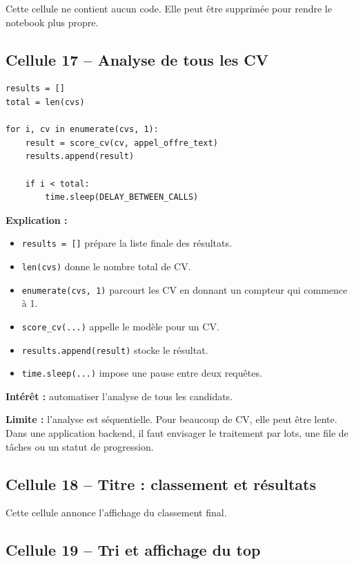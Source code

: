 \documentclass[12pt,a4paper]{article}
\begin{document}
Cette cellule ne contient aucun code. Elle peut être supprimée pour rendre le notebook plus propre.

\subsection{Cellule 17 -- Analyse de tous les CV}

\begin{lstlisting}[style=pythonstyle]
results = []
total = len(cvs)

for i, cv in enumerate(cvs, 1):
    result = score_cv(cv, appel_offre_text)
    results.append(result)

    if i < total:
        time.sleep(DELAY_BETWEEN_CALLS)
\end{lstlisting}

\textbf{Explication :}
\begin{itemize}
  \item \texttt{results = []} prépare la liste finale des résultats.
  \item \texttt{len(cvs)} donne le nombre total de CV.
  \item \texttt{enumerate(cvs, 1)} parcourt les CV en donnant un compteur qui commence à 1.
  \item \texttt{score\_cv(...)} appelle le modèle pour un CV.
  \item \texttt{results.append(result)} stocke le résultat.
  \item \texttt{time.sleep(...)} impose une pause entre deux requêtes.
\end{itemize}

\textbf{Intérêt :} automatiser l'analyse de tous les candidats.

\textbf{Limite :} l'analyse est séquentielle. Pour beaucoup de CV, elle peut être lente. Dans une application backend, il faut envisager le traitement par lots, une file de tâches ou un statut de progression.

\subsection{Cellule 18 -- Titre : classement et résultats}

Cette cellule annonce l'affichage du classement final.

\subsection{Cellule 19 -- Tri et affichage du top}
\end{document}
